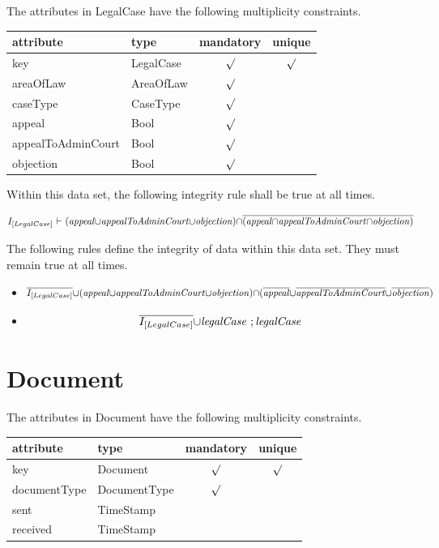 \documentclass[10pt,a4paper]{report}              %
\theoremstyle{plain}\theorembodyfont{\rmfamily}\newtheorem{definition}{Definition}[section]
\theoremstyle{plain}\theorembodyfont{\rmfamily}\newtheorem{designrule}[definition]{Requirement}
\def\id#1{\mbox{\em #1\/}}
\newcommand{\cmpl}[1]{\overline{#1}}
\begin{document}
\label{sct:plug LegalCase}

The attributes in LegalCase have the following multiplicity constraints. 

\begin{center}
\begin{tabular}{llcc}
attribute & type & mandatory & unique\\
\hline
key  & LegalCase & $\surd$ & $\surd$\\
areaOfLaw & AreaOfLaw & $\surd$ & \\
caseType & CaseType & $\surd$ & \\
appeal & Bool & $\surd$ & \\
appealToAdminCourt & Bool & $\surd$ & \\
objection & Bool & $\surd$ & \\
\end{tabular}
\end{center}

Within this data set, the following integrity rule shall be true at all times. 

\[I_{[LegalCase]}\ {\vdash}\ ({\id{appeal}}{\cup}{\id{appealToAdminCourt}}{\cup}{\id{objection}}){\cap}\cmpl{({\id{appeal}}{\cap}{\id{appealToAdminCourt}}{\cap}{\id{objection}})}\]

The following rules define the integrity of data within this data set. They must remain true at all times. 

\begin{itemize}
\item
  \[\cmpl{I_{[LegalCase]}}{\cup}({\id{appeal}}{\cup}{\id{appealToAdminCourt}}{\cup}{\id{objection}}){\cap}(\cmpl{{\id{appeal}}}{\cup}\cmpl{{\id{appealToAdminCourt}}}{\cup}\cmpl{{\id{objection}}})\]
\item
  \[\cmpl{I_{[LegalCase]}}{\cup}{\id{legalCase}}~;{\id{legalCase}}\]
\end{itemize}
\section{Document}

\label{sct:plug Document}

The attributes in Document have the following multiplicity constraints. 

\begin{center}
\begin{tabular}{llcc}
attribute & type & mandatory & unique\\
\hline
key  & Document & $\surd$ & $\surd$\\
documentType & DocumentType & $\surd$ & \\
sent & TimeStamp &  & \\
received & TimeStamp &  & \\
\end{tabular}
\end{center}
\end{document}
